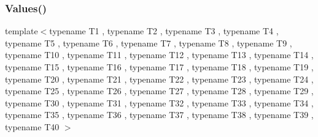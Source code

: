 \mbox{\label{namespacetesting_adaa8b96d44c103a70e5c4a4b3430ef4d}} 
\subsubsection{\texorpdfstring{Values()}{Values()}\hspace{0.1cm}{\footnotesize\ttfamily [41/51]}}
{\footnotesize\ttfamily template$<$typename T1 , typename T2 , typename T3 , typename T4 , typename T5 , typename T6 , typename T7 , typename T8 , typename T9 , typename T10 , typename T11 , typename T12 , typename T13 , typename T14 , typename T15 , typename T16 , typename T17 , typename T18 , typename T19 , typename T20 , typename T21 , typename T22 , typename T23 , typename T24 , typename T25 , typename T26 , typename T27 , typename T28 , typename T29 , typename T30 , typename T31 , typename T32 , typename T33 , typename T34 , typename T35 , typename T36 , typename T37 , typename T38 , typename T39 , typename T40 $>$ \\
}
